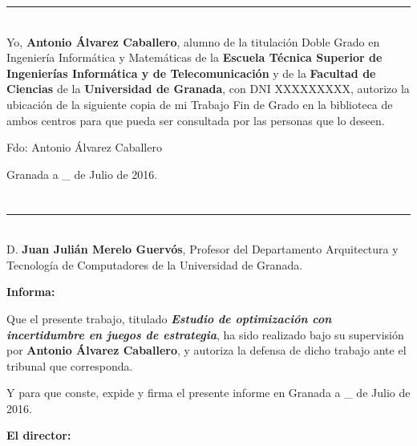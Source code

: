 \noindent\rule[-1ex]{\textwidth}{2pt}\\[4.5ex]

Yo, \textbf{Antonio Álvarez Caballero}, alumno de la titulación Doble Grado en
Ingeniería Informática y Matemáticas de la \textbf{Escuela Técnica Superior
de Ingenierías Informática y de Telecomunicación} y de la \textbf{Facultad de Ciencias}
de la \textbf{Universidad de Granada}, con DNI XXXXXXXXX, autorizo la
ubicación de la siguiente copia de mi Trabajo Fin de Grado en la biblioteca de
ambos centros para que pueda ser consultada por las personas que lo deseen.

\vspace{6cm}

\noindent Fdo: Antonio Álvarez Caballero

\vspace{2cm}

\begin{flushright}
Granada a \_ de Julio de 2016.
\end{flushright}


\chapter*{}
\thispagestyle{empty}

\noindent\rule[-1ex]{\textwidth}{2pt}\\[4.5ex]

D. \textbf{Juan Julián Merelo Guervós}, Profesor del Departamento Arquitectura y Tecnología de Computadores de la Universidad de Granada.

\vspace{0.5cm}

\textbf{Informa:}

\vspace{0.5cm}

Que el presente trabajo, titulado \textit{\textbf{Estudio de optimización con incertidumbre en juegos de estrategia}},
ha sido realizado bajo su supervisión por \textbf{Antonio Álvarez Caballero}, y autoriza la defensa de dicho trabajo ante el tribunal
que corresponda.

\vspace{0.5cm}

Y para que conste, expide y firma el presente informe en Granada a \_ de Julio de 2016.

\vspace{1cm}

\textbf{El director:}

\vspace{5cm}

